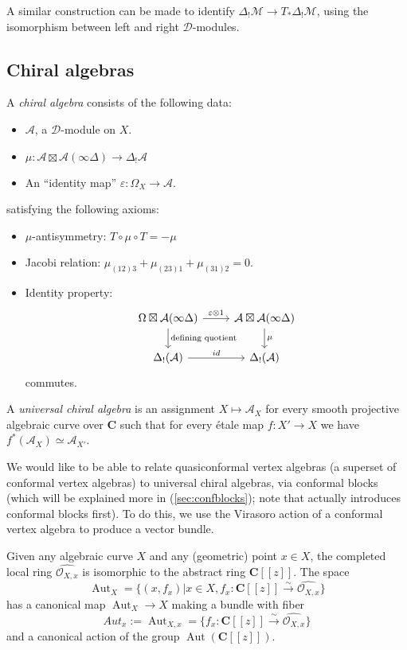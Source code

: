 \documentclass{article}
\newcommand{\CC}{\mathbold{C}}
\newcommand{\Oo}{\mathcal{O}}
\newcommand{\Dd}{\mathcal{D}}
\newcommand{\Aa}{\mathcal{A}}
\newcommand{\Mm}{\mathcal{M}}
\DeclareMathOperator{\Aut}{Aut}
\begin{document}
A similar construction can be made to identify $\Delta_!\Mm \rightarrow T_*\Delta_!\Mm$, using the isomorphism between left and right $\Dd$-modules.
\subsection{Chiral algebras}
\label{sec:chiraldef}
A \textit{chiral algebra} consists of the following data:
\begin{itemize}
\item $\Aa$, a $\Dd$-module on $X$.
\item $\mu: \Aa \boxtimes \Aa (\infty \Delta) \rightarrow \Delta_! \Aa$
\item An ``identity map'' $\varepsilon: \Omega_X \rightarrow \Aa$.
\end{itemize}
satisfying the following axioms:
\begin{itemize}
\item $\mu$-antisymmetry: $T \circ \mu \circ T=-\mu$
\item Jacobi relation: $\mu_{(12)3}+\mu_{(23)1}+\mu_{(31)2}=0$.
\item Identity property:
\[
  \begin{tikzcd}
    \Omega \boxtimes \Aa (\infty \Delta) \arrow[r,"\varepsilon \otimes 1"] \arrow[d,"\textrm{defining quotient}"] & \Aa \boxtimes \Aa (\infty \Delta) \arrow[d,"\mu"]\\
    \Delta_!(\Aa) \arrow[r,"id"] & \Delta_!(\Aa)
  \end{tikzcd}
\]
commutes.
\end{itemize}
A \textit{universal chiral algebra} is an assignment $X \mapsto \Aa_X$ for every smooth projective algebraic curve over $\CC$ such that for every étale map $f: X' \rightarrow X$ we have $f^*(\Aa_X) \simeq \Aa_{X'}$.

We would like to be able to relate quasiconformal vertex algebras (a superset of conformal vertex algebras) to universal chiral algebras, via conformal blocks (which will be explained more in (\ref{sec:confblocks}); note that \cite{MR2082709} actually introduces conformal blocks first).  To do this, we use the Virasoro action of a conformal vertex algebra to produce a vector bundle.

Given any algebraic curve $X$ and any (geometric) point $x \in X$, the completed local ring $\widehat{\Oo_{X,x}}$ is isomorphic to the abstract ring $\CC[[z]]$.  The space
\[\Aut_X=\{(x,f_x)|x \in X, f_x: \CC[[z]] \overset{\sim}{\rightarrow} \widehat{\Oo_{X,x}} \} \]
has a canonical map $\Aut_X \rightarrow X$ making a bundle with fiber
\[Aut_x := \Aut_{X,x} = \{f_x: \CC[[z]] \overset{\sim}{\rightarrow} \widehat{\Oo_{X,x}} \} \]
and a canonical action of the group $\Aut(\CC[[z]])$.
\end{document}
